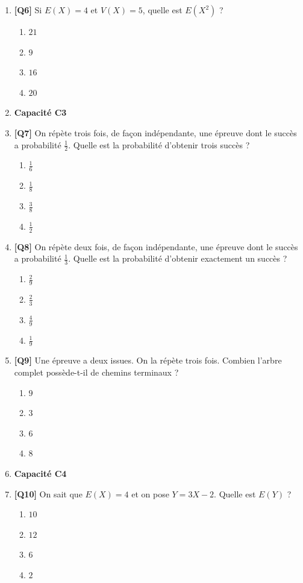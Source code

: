 \begin{enumerate}
\item \textbf{[Q6]} Si $E(X) = 4$ et $V(X) = 5$, quelle est $E(X^2)$ ?
  \begin{enumerate}[label=\Alph*.]
    \item $21$
    \item $9$
    \item $16$
    \item $20$
  \end{enumerate}

\item[] \textbf{Capacité C3}

\item \textbf{[Q7]} On répète trois fois, de façon indépendante, une épreuve dont le succès a probabilité $\frac{1}{2}$. Quelle est la probabilité d'obtenir trois succès ?
  \begin{enumerate}[label=\Alph*.]
    \item $\frac{1}{6}$
    \item $\frac{1}{8}$
    \item $\frac{3}{8}$
    \item $\frac{1}{2}$
  \end{enumerate}

\item \textbf{[Q8]} On répète deux fois, de façon indépendante, une épreuve dont le succès a probabilité $\frac{1}{3}$. Quelle est la probabilité d'obtenir exactement un succès ?
  \begin{enumerate}[label=\Alph*.]
    \item $\frac{2}{9}$
    \item $\frac{2}{3}$
    \item $\frac{4}{9}$
    \item $\frac{1}{9}$
  \end{enumerate}

\item \textbf{[Q9]} Une épreuve a deux issues. On la répète trois fois. Combien l'arbre complet possède-t-il de chemins terminaux ?
  \begin{enumerate}[label=\Alph*.]
    \item $9$
    \item $3$
    \item $6$
    \item $8$
  \end{enumerate}

\item[] \textbf{Capacité C4}

\item \textbf{[Q10]} On sait que $E(X)=4$ et on pose $Y=3X-2$. Quelle est $E(Y)$ ?
  \begin{enumerate}[label=\Alph*.]
    \item $10$
    \item $12$
    \item $6$
    \item $2$
  \end{enumerate}


\end{enumerate}
